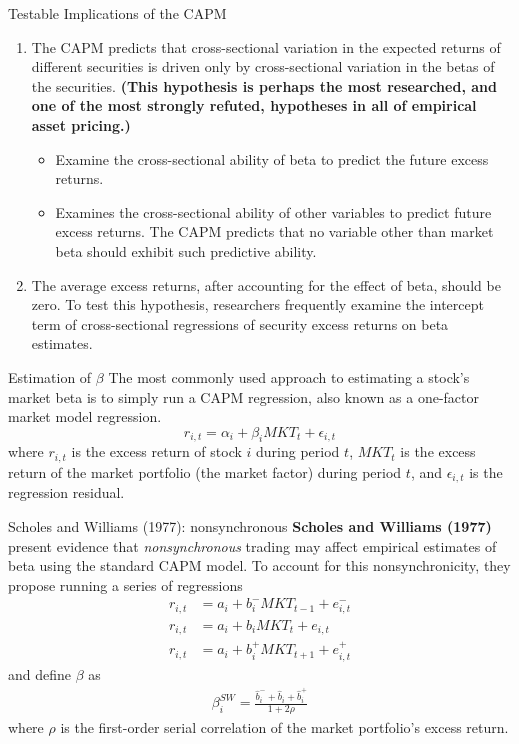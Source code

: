\documentclass{beamer}
\begin{document}
\begin{frame}{Testable Implications of the CAPM}
	\begin{enumerate}
		\item The CAPM predicts that cross-sectional variation in the expected returns of different securities is driven only by cross-sectional variation in the betas
		of the securities. \textbf{(This hypothesis is perhaps the most researched, and one of the most strongly refuted, hypotheses in all of empirical asset pricing.)}
		\begin{itemize}
			\item Examine the cross-sectional ability of beta to predict the future excess returns.
			\item Examines the cross-sectional ability of other variables to predict future excess returns. The CAPM predicts that no variable other than market beta should exhibit such predictive ability.
		\end{itemize}
	\item The average excess returns, after accounting for the effect of beta, should be zero. To test this hypothesis, researchers frequently examine the intercept term of cross-sectional regressions of security excess returns on beta estimates.
	\end{enumerate}
\end{frame}

\begin{frame}{Estimation of $ \beta $}
	 The most commonly used approach to estimating a stock’s market beta is to
	simply run a CAPM regression, also known as a one-factor market model regression.
	\begin{equation}\label{equ: CAPM}
		r_{i, t}=\alpha_{i}+\beta_{i} M K T_{t}+\epsilon_{i, t}
	\end{equation}
where $ r_{i, t} $ is the excess return of stock $ i $ during period $ t $, $ M K T_{t} $ is the excess return of the market portfolio (the market factor) during period $ t $, and $ \epsilon_{i, t} $ is the regression residual.
\end{frame}

\begin{frame}{Scholes and Williams (1977): nonsynchronous}
	\textbf{Scholes and Williams (1977)} present evidence that \textit{nonsynchronous} trading may affect empirical estimates of beta using the standard CAPM model. To account for this nonsynchronicity, they propose running a series of regressions
	\begin{align}
		r_{i, t} &=a_{i}+b_{i}^{-} M K T_{t-1}+e_{i, t}^{-} \\
		r_{i, t} &=a_{i}+b_{i} M K T_{t}+e_{i, t} \\
		r_{i, t} &=a_{i}+b_{i}^{+} M K T_{t+1}+e_{i, t}^{+}
	\end{align}
	and define $ \beta $ as
	\begin{align}
		\beta_{i}^{S W}=\frac{\hat{b}_{i}^{-}+\hat{b}_{i}+\hat{b}_{i}^{+}}{1+2 \rho}
	\end{align}
where $ \rho $ is the first-order serial correlation of the market portfolio's excess return.
\end{frame}
\end{document}
